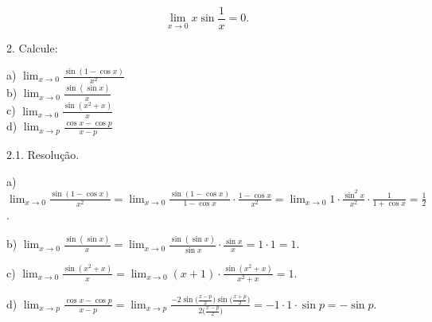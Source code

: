 \documentclass{article}
\begin{document}
{\begin{newpage}
$$\displaystyle{\lim_{x\to 0}} x\sin{\frac{1}{x}} = 0.$$
\par
\vspace{0.3cm}
\begin{flushleft}
2. Calcule:
\end{flushleft}
\par
\begin{multicols}{4}
\hspace{-15pt}a) $\displaystyle{\lim_{x\to 0}} \frac{\sin{(1-\cos{x})}}{x^2}$\\
b) $\displaystyle{\lim_{x\to 0}} \frac{\sin{(\sin{x})}}{x}$\\
c) $\displaystyle{\lim_{x\to 0}} \frac{\sin{(x^2 + x)}}{x}$\\
d) $\displaystyle{\lim_{x\to p}} \frac{\cos{x} - \cos{p}}{x-p}$
\end{multicols}
\par
\vspace{0.3cm}
\begin{flushleft}
2.1. Resolução.
\end{flushleft}
\par
a) $\displaystyle{\lim_{x\to 0} \frac{\sin{(1-\cos{x})}}{x^2} = \lim_{x\to 0} \frac{\sin{(1-\cos{x})}}{1-\cos{x}}\cdot\frac{1-\cos{x}}{x^2} = \lim_{x\to 0} 1\cdot\frac{\sin^2{x}}{x^2}\cdot\frac{1}{1+\cos{x}} = \frac{1}{2}}$.
\par
\vspace{0.3cm}
b) $\displaystyle{\lim_{x\to 0} \frac{\sin{(\sin{x})}}{x} = \lim_{x\to 0} \frac{\sin{(\sin{x})}}{\sin{x}}\cdot\frac{\sin{x}}{x} = 1\cdot1 = 1}$.
\par
\vspace{0.3cm}
c) $\displaystyle{\lim_{x\to 0} \frac{\sin{(x^2 + x)}}{x} = \lim_{x\to 0} (x+1)\cdot\frac{\sin{(x^2 + x)}}{x^2 + x} = 1}$.
\par
\vspace{0.3cm}
d) $\displaystyle{\lim_{x\to p} \frac{\cos{x} - \cos{p}}{x-p} = \lim_{x\to p} \frac{-2\sin{\Big(\frac{x-p}{2}\Big)}\sin{\Big(\frac{x+p}{2}\Big)}}{2\Big(\frac{x-p}{2}\Big)} = -1\cdot1\cdot\sin{p} = -\sin{p}}$.
\par
\vspace{0.3cm}

\end{newpage}}
\end{document}
